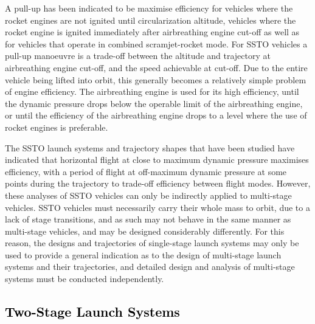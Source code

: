 A pull-up has been indicated to be maximise efficiency for vehicles where the rocket engines are not ignited until circularization altitude\cite{Powell1991,Lu1993}, vehicles where the rocket engine is ignited immediately after airbreathing engine cut-off\cite{Trefny1999,Roche2000,Pescetelli2012} as well as for vehicles that operate in combined scramjet-rocket mode\cite{Young2006,Bradford2000}.
For SSTO vehicles a pull-up manoeuvre is a trade-off between the altitude and trajectory at airbreathing engine cut-off, and the speed achievable at cut-off. Due to the entire vehicle being lifted into orbit, this generally becomes a relatively simple problem of engine efficiency. The airbreathing engine is used for its high efficiency, until the dynamic pressure drops below the operable limit of the airbreathing engine, or until the efficiency of the airbreathing engine drops to a level where the use of rocket engines is preferable. 

The SSTO launch systems and trajectory shapes that have been studied have indicated that horizontal flight at close to maximum dynamic pressure maximises efficiency, with a period of flight at off-maximum dynamic pressure at some points during the trajectory to trade-off efficiency between flight modes. 
However, these analyses of SSTO vehicles can only be indirectly applied to multi-stage vehicles. SSTO vehicles must necessarily carry their whole mass to orbit, due to a lack of stage transitions, and as such may not behave in the same manner as multi-stage vehicles, and may be designed considerably differently. For this reason, the designs and trajectories of single-stage launch systems may only be used to provide a general indication as to the design of multi-stage launch systems and their trajectories, and detailed design and analysis of multi-stage systems must be conducted independently.
  	
  \textcolor{black}{
  \subsection{Two-Stage Launch Systems} \label{sec:twostagelaunchers}
}




